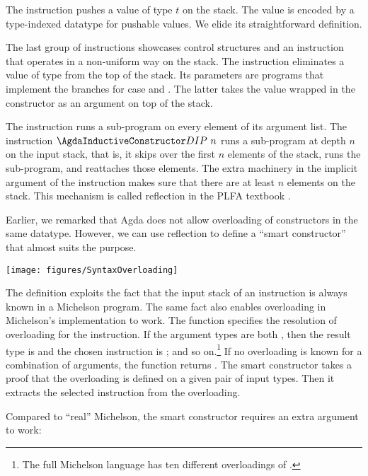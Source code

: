 The  instruction pushes a value of type $t$ on the stack. The
value is encoded by a type-indexed datatype  for
pushable values. We elide its straightforward definition.

The last group of instructions showcases control structures and an
instruction that operates in a non-uniform way on the stack. The
instruction  eliminates a value of  type from the
top of the stack. Its parameters are programs that implement the branches for case 
and . The latter takes the value wrapped in the 
constructor as an argument on top of the stack.

The instruction  runs a sub-program on every element of its
argument list. The instruction $\ACon{DIP}~n$ runs a sub-program at
depth $n$ on the input stack, that is, it skips over the first $n$
elements of the stack, runs the sub-program, and reattaches those
elements. The extra machinery in the implicit argument of the
instruction makes sure that there are at least $n$ elements on the
stack. This mechanism is called reflection in the  PLFA textbook
\cite{plfa}.

Earlier, we remarked that Agda does not allow overloading of
constructors in the same datatype. However, we can use reflection to
define a ``smart constructor'' that almost suits the purpose.
\begin{flushleft}
  \texttt{[image: figures/SyntaxOverloading]}
\end{flushleft}

The definition exploits the fact that the input stack of an
instruction is always known in a Michelson program. The same fact also
enables overloading in Michelson's implementation to work.
The function  specifies the resolution of overloading
for the  instruction. If the argument types are both
, then the result type is  and the chosen instruction is
; and so on.\footnote{The full Michelson language has ten different
  overloadings of .} If no  overloading is known for a combination
of arguments, the function returns .
The smart constructor  takes a proof that the overloading is
defined on a given pair of input types. Then it extracts the selected
instruction from the overloading.

Compared to ``real'' Michelson, the smart constructor requires an
extra argument to work:
\SyntaxOverloadingExample

